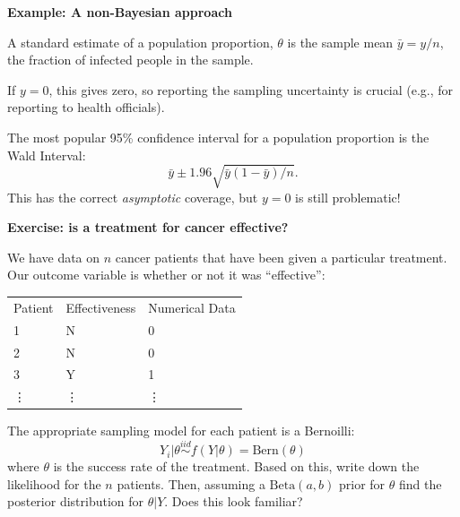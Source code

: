 \documentclass[12pt,xcolor=svgnames]{beamer}
\newcommand{\rd}{\color{red}}
\newcommand{\bl}{\color{blue}}
\newcommand{\theme}{\color{FireBrick}}
\newcommand{\fb}{\color{FireBrick}}
\newcommand{\mr}[1]{\mathrm{#1}}
\newcommand{\sk}{\vspace{.4cm}}
\newcommand{\nochap}{\vspace{0.5cm}}
\newcommand{\chap}[1]{{\theme \Large \bf #1} \sk}
\begin{document}
\begin{frame}
\chap{Example: A non-Bayesian approach}

A standard estimate of a population proportion, $\theta$ is the sample mean  $\bar{y} = y/n$, the fraction of infected people in the sample. 

\sk
If $y=0$, this gives zero, so reporting the sampling uncertainty is crucial (e.g., for reporting to health officials). 

\sk
The most popular 95\% confidence interval for a population proportion is the {\bl Wald Interval}:
\begin{equation*}
\bar{y} \pm 1.96 \sqrt{\bar{y}(1-\bar{y})/n}.
\end{equation*}
This has the correct {\it asymptotic} coverage, but {\rd $y=0$ is still problematic}!

\end{frame}


\begin{frame}
\nochap
{\bf \fb Exercise: is a treatment for cancer effective?}\\

{\footnotesize
We have data on $n$ cancer patients that have been given a particular treatment. Our outcome variable is whether or not it was ``effective'':
\begin{center}
 \begin{tabular}{lll}
Patient & Effectiveness & Numerical Data \\
1& N& 0\\
2&N&0\\
3&Y&1\\
\vdots &\vdots &\vdots \\
\end{tabular}
\end{center}
The appropriate sampling model for each patient is a Bernoilli:
$$Y_i|\theta  \stackrel{iid}{\sim} f(Y|\theta) = \text{Bern}(\theta)$$ 
where $\theta$ is the success rate of the treatment. Based on this, write down the likelihood for the $n$ patients. Then, assuming a $\mr{Beta}(a,b)$ prior for $\theta$ find the posterior distribution for $\theta|Y$. Does this look familiar?
}


\end{frame}
\end{document}
